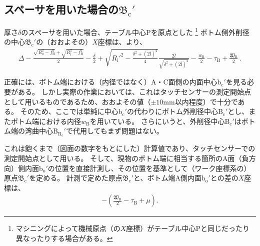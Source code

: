 \subsection[スペーサを用いた場合の\texorpdfstring{$\mathfrak B_\mathrm c'$}{Bc'}]
           {スペーサを用いた場合の$\boldsymbol{\mathfrak B_\mathrm c'}$}
厚さ$\delta$のスペーサを用いた場合、テーブル中心Pを原点とした
\footnote{マシニングによって機械原点（の$X$座標）がテーブル中心Pと同じだったり異なったりする場合がある。}\relax
ボトム側外削径の中心$\mathfrak B_\mathrm c'$の（おおよその）$X$座標は、より、
\begin{align*}
  \varDelta-\frac{\sqrt{R_\mathrm o^2-f_\mathrm B^2}+\sqrt{R_\mathrm i^2-f_\mathrm B^2}}2-\frac\delta2
  +\sqrt{R_\mathrm i'^2-\frac{\delta^2+(2\bar l)^2}4}\frac{2\bar l}{\sqrt{\delta^2+(2\bar l)^2}}
  -\frac{w_\mathrm B}2-\tau_\mathrm B+\frac{\mathfrak W_\mathrm B}2\ .
\end{align*}
\begin{hosoku}
正確には、ボトム端における（内径ではなく）A・C面側の内面中心b$_\mathrm c'$を見る必要がある。
しかし実際の作業においては、これはタッチセンサーの測定開始点として用いるものであるため、おおよその値（$\pm10$mm以内程度）で十分である。
そのため、ここでは単純に中心b$_\mathrm c'$の代わりにボトム外削径中心B$_\mathrm c'$とし、またボトム端における内径$w_\mathrm B$を用いている。
さらにいうと、外削径中心B$_\mathrm c'$はボトム端の湾曲中心B$_{\mathrm R_\mathrm c}'$で代用してもまず問題はない。
\end{hosoku}
これは飽くまで（図面の数字をもとにした）計算値であり、タッチセンサーでの測定開始点として用いる。
そして、現物のボトム端に相当する箇所のA面（負方向）側内面b$_\mathrm o'$の位置を直接計測し、その位置を基準として（ワーク座標系の）原点$\mathfrak B_\mathrm c'$を定める。
計測で定めた原点$\mathfrak B_\mathrm c'$と、ボトム端A側内面b$_\mathrm o'$との差の$X$座標は、
\begin{align*}
  -\left(\frac{\mathfrak W_\mathrm B}2-\tau_\mathrm B+\mu\right).
\end{align*}


